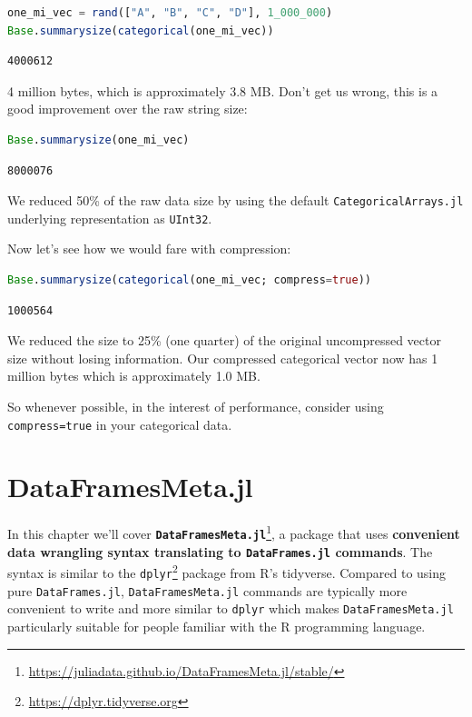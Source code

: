\documentclass[
  notoc %
]{tufte-book}
\DeclareRobustCommand{\href}[2]{#2\footnote{\url{#1}}}
\newcommand{\passthrough}[1]{#1}
\begin{document}
\begin{lstlisting}[language=Julia]
one_mi_vec = rand(["A", "B", "C", "D"], 1_000_000)
Base.summarysize(categorical(one_mi_vec))
\end{lstlisting}

\begin{lstlisting}
4000612
\end{lstlisting}

4 million bytes, which is approximately 3.8 MB. Don't get us wrong, this
is a good improvement over the raw string size:

\begin{lstlisting}[language=Julia]
Base.summarysize(one_mi_vec)
\end{lstlisting}

\begin{lstlisting}
8000076
\end{lstlisting}

We reduced 50\% of the raw data size by using the default
\passthrough{\lstinline!CategoricalArrays.jl!} underlying representation
as \passthrough{\lstinline!UInt32!}.

Now let's see how we would fare with compression:

\begin{lstlisting}[language=Julia]
Base.summarysize(categorical(one_mi_vec; compress=true))
\end{lstlisting}

\begin{lstlisting}
1000564
\end{lstlisting}

We reduced the size to 25\% (one quarter) of the original uncompressed
vector size without losing information. Our compressed categorical
vector now has 1 million bytes which is approximately 1.0 MB.

So whenever possible, in the interest of performance, consider using
\passthrough{\lstinline!compress=true!} in your categorical data.

\hypertarget{sec:dataframesmeta}{%
\chapter{DataFramesMeta.jl}\label{sec:dataframesmeta}}

In this chapter we'll cover
\href{https://juliadata.github.io/DataFramesMeta.jl/stable/}{\textbf{\passthrough{\lstinline!DataFramesMeta.jl!}}},
a package that uses \textbf{convenient data wrangling syntax translating
to \passthrough{\lstinline!DataFrames.jl!} commands}. The syntax is
similar to the
\href{https://dplyr.tidyverse.org}{\passthrough{\lstinline!dplyr!}}
package from R's tidyverse. Compared to using pure
\passthrough{\lstinline!DataFrames.jl!},
\passthrough{\lstinline!DataFramesMeta.jl!} commands are typically more
convenient to write and more similar to \passthrough{\lstinline!dplyr!}
which makes \passthrough{\lstinline!DataFramesMeta.jl!} particularly
suitable for people familiar with the R programming language.
\end{document}
